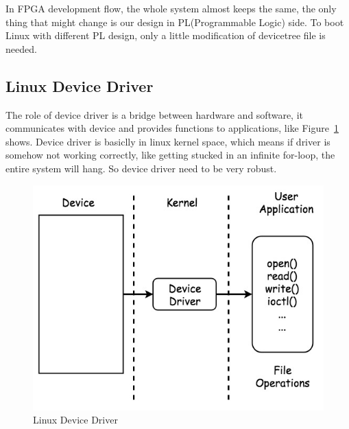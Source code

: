 In FPGA development flow, the whole system almost keeps the same, the only thing that might change 
is our design in PL(Programmable Logic) side. To boot Linux with different PL design, only 
a little modification of devicetree file is needed.     


\subsection{Linux Device Driver}
The role of device driver is a bridge between hardware and software, it communicates with device and provides functions to applications, like Figure~\ref{fig:Linux Device Driver} shows. Device driver is basiclly in linux kernel space, which means if driver is somehow not working correctly, like getting stucked in an infinite for-loop, the entire system will hang. So device driver need to be very robust. 

\begin{figure}[!htb]
  \centering
  \includegraphics[scale=0.5]{images/linux_device_driver.jpg}
  \caption[Linux Device Driver]{Linux Device Driver}
  \label{fig:Linux Device Driver}
\end{figure}



